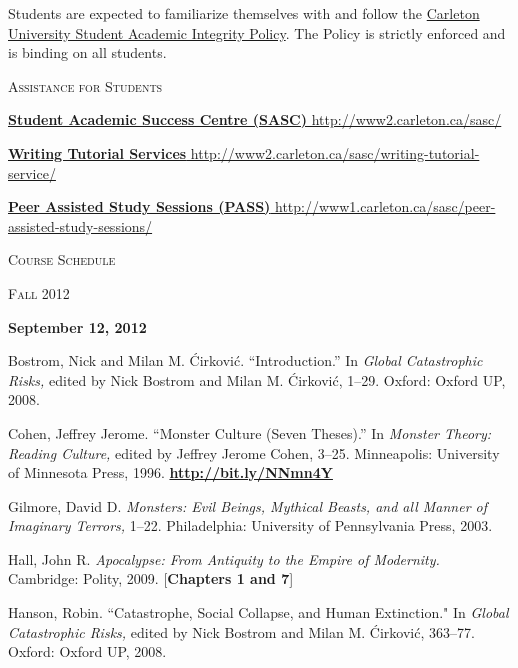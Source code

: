 \documentclass[12pt]{article}
\begin{document}
Students are expected to familiarize themselves with and follow the \href{http://www2.carleton.ca/studentaffairs/academic-integrity}{Carleton University Student Academic Integrity Policy}. The Policy is strictly enforced and is binding on all students.

{\large \textsc{Assistance for Students}}

\href{http://www2.carleton.ca/sasc/}{\textbf{Student Academic Success Centre (SASC)} http://www2.carleton.ca/sasc/}

\href{http://www2.carleton.ca/sasc/writing-tutorial-service/}{\textbf{Writing Tutorial Services} http://www2.carleton.ca/sasc/writing-tutorial-service/} 

\href{http://www1.carleton.ca/sasc/peer-assisted-study-sessions/}{\textbf{Peer Assisted Study Sessions (PASS)} http://www1.carleton.ca/sasc/peer-assisted-study-sessions/}

\newpage

\begin{center}
{\Large \textsc{Course Schedule}}

\vspace{.125in}

{\Large \textsc{Fall 2012}}
\end{center}

\vspace{.25in}

\textbf{September 12, 2012}

\begin{hangparas}{.5in}{1}
Bostrom, Nick and Milan M. \'Cirkovi\'c. ``Introduction.'' In \textit{Global Catastrophic Risks,} edited by Nick Bostrom and Milan M. \'Cirkovi\'c, 1--29. Oxford: Oxford UP, 2008.

Cohen, Jeffrey Jerome. ``Monster Culture (Seven Theses).'' In \textit{Monster Theory: Reading Culture,} edited by Jeffrey Jerome Cohen, 3--25. Minneapolis: University of Minnesota Press, 1996. \href{http://bit.ly/NNmn4Y}{\textbf{http://bit.ly/NNmn4Y}}

Gilmore, David D. \textit{Monsters: Evil Beings, Mythical Beasts, and all Manner of Imaginary Terrors,} 1--22. Philadelphia: University of Pennsylvania Press, 2003.

Hall, John R. \textit{Apocalypse: From Antiquity to the Empire of Modernity.} Cambridge: Polity, 2009. [\textbf{Chapters 1 and 7}]

Hanson, Robin. ``Catastrophe, Social Collapse, and Human Extinction." In \textit{Global Catastrophic Risks,} edited by Nick Bostrom and Milan M. \'Cirkovi\'c, 363--77. Oxford: Oxford UP, 2008.
\end{hangparas}
\end{document}
